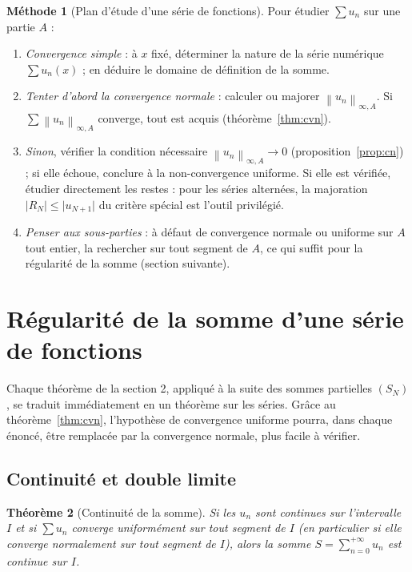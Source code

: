 \documentclass[11pt,a4paper]{article}
\theoremstyle{plain}
\newtheorem{theoreme}{Théorème}[section]
\theoremstyle{definition}
\newtheorem{methode}[theoreme]{Méthode}
\theoremstyle{remark}
\newcommand{\Ninf}[2]{\left\lVert #1 \right\rVert_{\infty,#2}}
\numberwithin{equation}{section}
\begin{document}
\begin{methode}[Plan d'étude d'une série de fonctions]\label{meth:series}
Pour étudier $\sum u_n$ sur une partie $A$ :
\begin{enumerate}
    \item \emph{Convergence simple} : à $x$ fixé, déterminer la nature de
    la série numérique $\sum u_n(x)$ ; en déduire le domaine de définition
    de la somme.
    \item \emph{Tenter d'abord la convergence normale} : calculer ou
    majorer $\Ninf{u_n}{A}$. Si $\sum\Ninf{u_n}{A}$ converge, tout est
    acquis (théorème~\ref{thm:cvn}).
    \item \emph{Sinon}, vérifier la condition nécessaire
    $\Ninf{u_n}{A}\to 0$ (proposition~\ref{prop:cn}) ; si elle échoue,
    conclure à la non-convergence uniforme. Si elle est vérifiée, étudier
    directement les restes : pour les séries alternées, la majoration
    $\lvert R_N\rvert\leq\lvert u_{N+1}\rvert$ du critère spécial est
    l'outil privilégié.
    \item \emph{Penser aux sous-parties} : à défaut de convergence normale
    ou uniforme sur $A$ tout entier, la rechercher sur tout segment de
    $A$, ce qui suffit pour la régularité de la somme (section suivante).
\end{enumerate}
\end{methode}

\section{Régularité de la somme d'une série de fonctions}

Chaque théorème de la section 2, appliqué à la suite des sommes partielles
$(S_N)$, se traduit immédiatement en un théorème sur les séries. Grâce au
théorème~\ref{thm:cvn}, l'hypothèse de convergence uniforme pourra, dans
chaque énoncé, être remplacée par la convergence normale, plus facile à
vérifier.

\subsection{Continuité et double limite}

\begin{theoreme}[Continuité de la somme]\label{thm:continuite-series}
Si les $u_n$ sont continues sur l'intervalle $I$ et si $\sum u_n$ converge
uniformément sur tout segment de $I$ (en particulier si elle converge
normalement sur tout segment de $I$), alors la somme
$S=\sum_{n=0}^{+\infty}u_n$ est continue sur $I$.
\end{theoreme}
\end{document}
